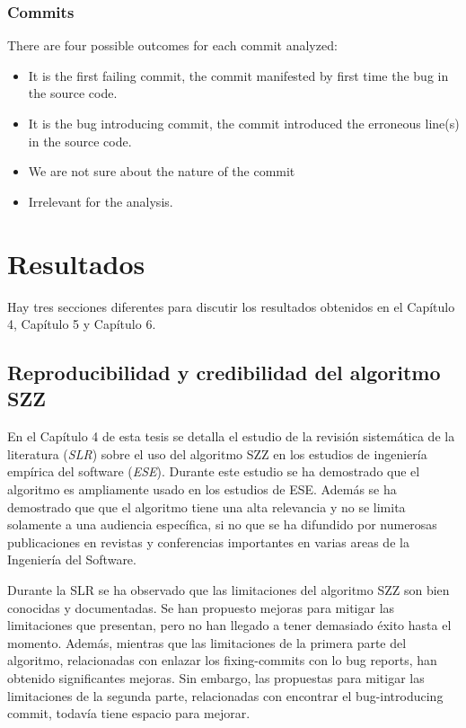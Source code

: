 \documentclass[a4paper, 12pt]{book}
\begin{document}
\subsubsection{Commits}

There are four possible outcomes for each commit analyzed:
\begin{itemize}
	\item It is the first failing commit, the commit manifested by first time the bug in the source code.
	\item It is the bug introducing commit, the commit introduced the erroneous line(s) in the source code.
	\item We are not sure about the nature of the commit
	\item Irrelevant for the analysis. %
\end{itemize}


\section{Resultados}
Hay tres secciones diferentes para discutir los resultados obtenidos en el Cap\'itulo 4, Cap\'itulo 5 y Cap\'itulo 6.

\subsection{Reproducibilidad y credibilidad del algoritmo SZZ  }
\label{subsec:resultadosSLR}

En el Cap\'itulo 4 de esta tesis se detalla el estudio de la revisi\'on sistem\'atica de la literatura (\emph{SLR}) sobre el uso del algoritmo SZZ en los estudios de ingenier\'ia emp\'irica del software (\emph{ESE}). Durante este estudio se ha demostrado que el algoritmo es ampliamente usado en los estudios de ESE. Adem\'as se ha demostrado que que el algoritmo tiene una alta relevancia y no se limita solamente a una audiencia espec\'ifica, si no que se ha difundido por numerosas publicaciones en revistas y conferencias importantes en varias areas de la Ingenier\'ia del Software.

Durante la SLR se ha observado que las limitaciones del algoritmo SZZ son bien conocidas y documentadas. Se han propuesto mejoras para mitigar las limitaciones que presentan, pero no han llegado a tener demasiado \'exito hasta el momento. Adem\'as, mientras que las limitaciones de la primera parte del algoritmo, relacionadas con enlazar los fixing-commits con lo bug reports, han obtenido significantes mejoras. Sin embargo, las propuestas para mitigar las limitaciones de la segunda parte, relacionadas con encontrar el bug-introducing commit, todav\'ia tiene espacio para mejorar.   
\end{document}
